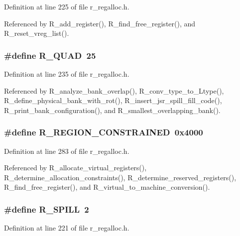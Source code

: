 Definition at line 225 of file r\_\-regalloc.h.

Referenced by R\_\-add\_\-register(), R\_\-find\_\-free\_\-register(), and R\_\-reset\_\-vreg\_\-list().
\subsubsection{\setlength{\rightskip}{0pt plus 5cm}\#define R\_\-QUAD~25}\label{r__regalloc_8h_a55345e3b97f2cd90611c5a97999a48d}




Definition at line 235 of file r\_\-regalloc.h.

Referenced by R\_\-analyze\_\-bank\_\-overlap(), R\_\-conv\_\-type\_\-to\_\-Ltype(), R\_\-define\_\-physical\_\-bank\_\-with\_\-rot(), R\_\-insert\_\-jsr\_\-spill\_\-fill\_\-code(), R\_\-print\_\-bank\_\-configuration(), and R\_\-smallest\_\-overlapping\_\-bank().
\subsubsection{\setlength{\rightskip}{0pt plus 5cm}\#define R\_\-REGION\_\-CONSTRAINED~0x4000}\label{r__regalloc_8h_9b1705644580fd07cd64aceff34fb1e7}




Definition at line 283 of file r\_\-regalloc.h.

Referenced by R\_\-allocate\_\-virtual\_\-registers(), R\_\-determine\_\-allocation\_\-constraints(), R\_\-determine\_\-reserved\_\-registers(), R\_\-find\_\-free\_\-register(), and R\_\-virtual\_\-to\_\-machine\_\-conversion().
\subsubsection{\setlength{\rightskip}{0pt plus 5cm}\#define R\_\-SPILL~2}\label{r__regalloc_8h_7e79950b2a2e9a13850c80824635b176}




Definition at line 221 of file r\_\-regalloc.h.
